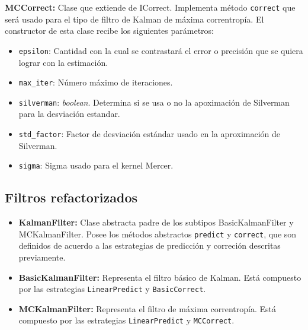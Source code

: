 \textbf{MCCorrect:} Clase que extiende de ICorrect. Implementa m\'etodo \texttt{correct} que ser\'a usado para el tipo de filtro de Kalman de m\'axima correntrop\'ia. El constructor de esta clase recibe los siguientes par\'ametros:

\begin{itemize}
\item \texttt{epsilon}: Cantidad con la cual se contrastar\'a el error o precisi\'on que se quiera lograr con la estimaci\'on.
\item \texttt{max\_iter}: N\'umero m\'aximo de iteraciones.
\item \texttt{silverman}: \textit{boolean}. Determina si se usa o no la apoximaci\'on de Silverman para la desviaci\'on estandar.
\item \texttt{std\_factor}: Factor de desviaci\'on est\'andar usado en la aproximaci\'on de Silverman.
\item \texttt{sigma}: Sigma usado para el kernel Mercer.
\end{itemize}

\subsection{Filtros refactorizados}

\begin{itemize}
\item \textbf{KalmanFilter:} Clase abstracta padre de los subtipos BasicKalmanFilter y MCKalmanFilter. Posee los m\'etodos abstractos \texttt{predict} y \texttt{correct}, que son definidos de acuerdo a las estrategias de predicci\'on y correci\'on descritas previamente.
\item \textbf{BasicKalmanFilter:} Representa el filtro b\'asico de Kalman. Est\'a compuesto por las estrategias \texttt{LinearPredict} y \texttt{BasicCorrect}.
\item \textbf{MCKalmanFilter:} Representa el filtro de m\'axima correntrop\'ia. Est\'a compuesto por las estrategias \texttt{LinearPredict} y \texttt{MCCorrect}.
\end{itemize}
\bigskip

